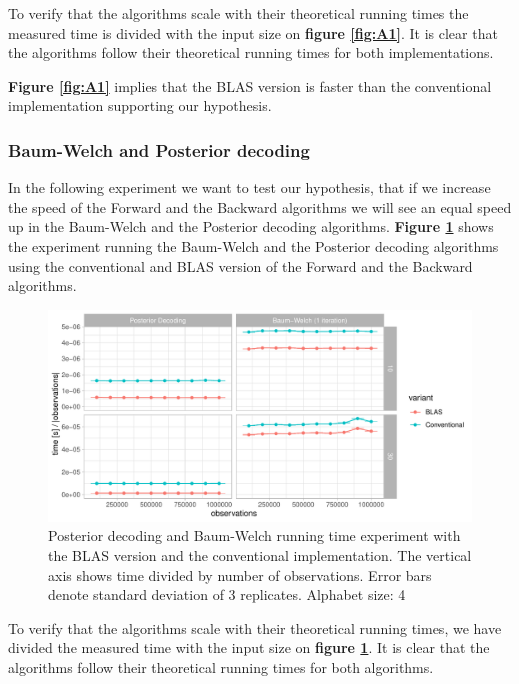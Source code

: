 To verify that the algorithms scale with their theoretical running times the measured time is divided with the input size on \textbf{figure \ref{fig:A1}}. It is clear that the algorithms follow their theoretical running times for both implementations.

\textbf{Figure \ref{fig:A1}} implies that the BLAS version is faster than the conventional implementation supporting our hypothesis.

\subsubsection{Baum-Welch and Posterior decoding}\label{sec:A2}

In the following experiment we want to test our hypothesis, that if we increase the speed of the Forward and the Backward algorithms we will see an equal speed up in the Baum-Welch and the Posterior decoding algorithms. \textbf{Figure \ref{fig:A2}} shows the experiment running the Baum-Welch and the Posterior decoding algorithms using the conventional and BLAS version of the Forward and the Backward algorithms.

\begin{figure}[H]
  \centering
  \includegraphics[scale=0.85]{figures/figure_A2.pdf}
  \caption{\small{Posterior decoding and Baum-Welch running time experiment with the BLAS version and the conventional implementation. The vertical axis shows time divided by number of observations. Error bars denote standard deviation of 3 replicates. Alphabet size: 4}}
  \label{fig:A2}
\end{figure}

To verify that the algorithms scale with their theoretical running times, we have divided the measured time with the input size on \textbf{figure \ref{fig:A2}}. It is clear that the algorithms follow their theoretical running times for both algorithms.

